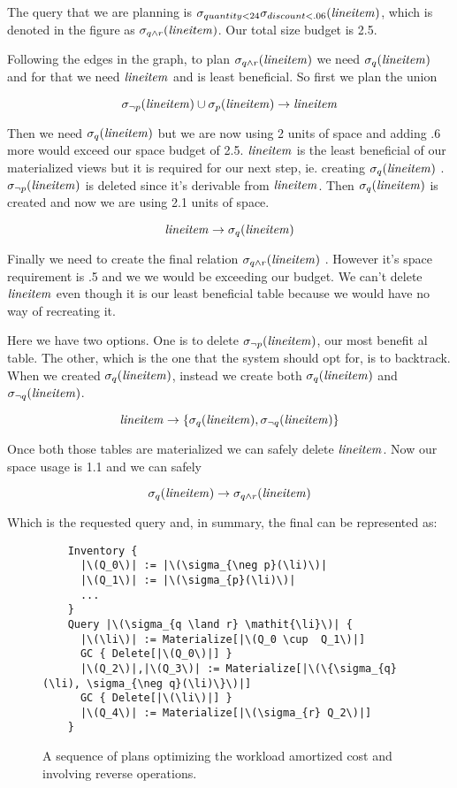 The query that we are planning is
\(\sigma_{quantity < 24} \sigma_{discount < .06} (\mathit{lineitem})\), which is
denoted in the figure as \(\sigma_{q \land r}(\mathit{lineitem})\). Our total size
budget is 2.5.

Following the edges in the graph, to plan \(\sigma_{q \land r}(\mathit{lineitem})\)
we need \(\sigma_{q}(\mathit{lineitem})\) and for that we need \(\mathit{lineitem}\) and is least
beneficial. So first we plan the union

\[
  \sigma_{\neg p}(\mathit{lineitem}) \cup \sigma_{p}(\mathit{lineitem}) \rightarrow \mathit{lineitem}
\]

Then we need \(\sigma_{q}(\mathit{lineitem})\) but we are now using 2 units of space
and adding .6 more would exceed our space budget of 2.5. \(\mathit{lineitem}\) is
the least beneficial of our materialized views but it is required for
our next step, ie. creating \(\sigma_{q}(\mathit{lineitem})\) . \(\sigma_{\neg
p}(\mathit{lineitem})\) is deleted since it's derivable from \(\mathit{lineitem}\). Then
\(\sigma_{q}(\mathit{lineitem})\) is created and now we are using 2.1 units of
space.

\[
  \mathit{lineitem} \rightarrow \sigma_{q}(\mathit{lineitem})
\]

Finally we need to create the final relation \(\sigma_{q \land
  r}(\mathit{lineitem})\) . However it's space requirement is .5 and we we would
be exceeding our budget. We can't delete \(\mathit{lineitem}\) even though it
is our least beneficial table because we would have no way of
recreating it.

Here we have two options. One is to delete \(\sigma_{\neg
  p}(\mathit{lineitem})\), our most benefit al table. The other, which is the one
that the system should opt for, is to backtrack. When we created
\(\sigma_{q}(\mathit{lineitem})\), instead we create both
\(\sigma_{q}(\mathit{lineitem})\) and \(\sigma_{\neg q}(\mathit{lineitem})\).

\[
  \mathit{lineitem} \rightarrow \{\sigma_{q}(\mathit{lineitem}), \sigma_{\neg q}(\mathit{lineitem})\}
\]

Once both those tables are materialized we can safely delete
\(\mathit{lineitem}\). Now our space usage is 1.1 and we can safely

\[
  \sigma_{q}(\mathit{lineitem}) \rightarrow \sigma_{q \land r} (\mathit{lineitem})
\]

Which is the requested query and, in summary, the final can be
represented as:


\begin{figure}[H]
\begin{verbatim}
    Inventory {
      |\(Q_0\)| := |\(\sigma_{\neg p}(\li)\)|
      |\(Q_1\)| := |\(\sigma_{p}(\li)\)|
      ...
    }
    Query |\(\sigma_{q \land r} \mathit{\li}\)| {
      |\(\li\)| := Materialize[|\(Q_0 \cup  Q_1\)|]
      GC { Delete[|\(Q_0\)|] }
      |\(Q_2\)|,|\(Q_3\)| := Materialize[|\(\{\sigma_{q}(\li), \sigma_{\neg q}(\li)\}\)|]
      GC { Delete[|\(\li\)|] }
      |\(Q_4\)| := Materialize[|\(\sigma_{r} Q_2\)|]
    }
\end{verbatim}
  \caption{\label{fig:reverse_operations}A sequence of plans optimizing
    the workload amortized cost and involving reverse operations.}
\end{figure}

